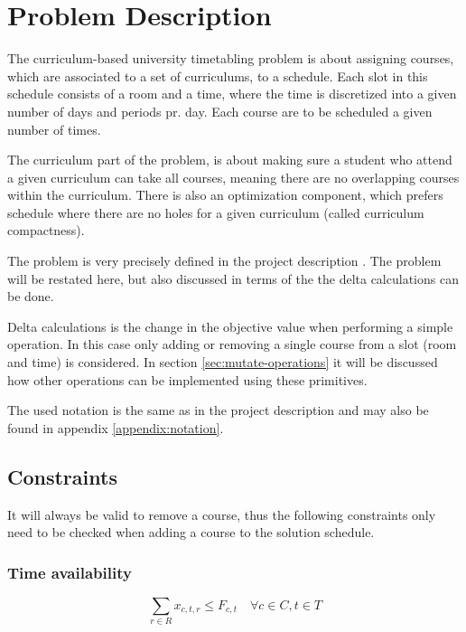 \section{Problem Description}

The curriculum-based university timetabling problem is about assigning courses, which are associated to a set of curriculums, to a schedule. Each slot in this schedule consists of a room and a time, where the time is discretized into a given number of days and periods pr. day. Each course are to be scheduled a given number of times.

The curriculum part of the problem, is about making sure a student who attend a given curriculum can take all courses, meaning there are no overlapping courses within the  curriculum. There is also an optimization component, which prefers schedule where there are no holes for a given curriculum (called curriculum compactness).

The problem is very precisely defined in the project description \cite{assignment}. The problem will be restated here, but also discussed in terms of the the delta calculations can be done.

Delta calculations is the change in the objective value when performing a simple operation. In this case only adding or removing a single course from a slot (room and time) is considered. In section \ref{sec:mutate-operations} it will be discussed how other operations can be implemented using these primitives.

The used notation is the same as in the project description \cite{assignment} and may also be found in appendix \ref{appendix:notation}.

\subsection{Constraints}
\label{sec:problem-constraints}

It will always be valid to remove a course, thus the following constraints only need to be checked when adding a course to the solution schedule.

\subsubsection{Time availability}
\begin{equation}
    \sum_{r \in R} x_{c, t, r} \le F_{c, t} \quad \forall c \in C, t \in T
\end{equation}

